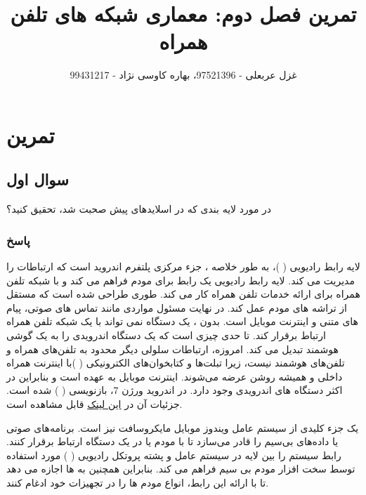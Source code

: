 \documentclass{report}
\title{تمرین فصل دوم: معماری شبکه های تلفن همراه
}
\author{غزل عربعلی - 97521396، بهاره کاوسی نژاد - 99431217}
\begin{document}
\maketitle
{}
\chapter*{تمرین 
}

\section*{سوال اول}
در مورد لایه بندی
  که در اسلایدهای پیش صحبت شد، تحقیق کنید؟

\subsection*{پاسخ}
لایه رابط رادیویی (
)، به طور خلاصه
 ، جزء مرکزی پلتفرم اندروید است که ارتباطات 
 را مدیریت می کند. لایه رابط رادیویی یک رابط برای مودم 
  فراهم می کند و با شبکه تلفن همراه برای ارائه خدمات تلفن همراه کار می کند.
    طوری طراحی شده است که مستقل از تراشه های مودم 
     عمل کند. در نهایت 
      مسئول مواردی مانند تماس های صوتی، پیام های متنی و اینترنت موبایل است. بدون 
      ، یک دستگاه
        نمی تواند با یک شبکه تلفن همراه ارتباط برقرار کند. 
         تا حدی چیزی است که یک دستگاه اندرویدی را به یک گوشی هوشمند تبدیل می کند. امروزه، ارتباطات سلولی دیگر محدود به تلفن‌های همراه و تلفن‌های هوشمند نیست، زیرا تبلت‌ها و کتابخوان‌های الکترونیکی (
         )با اینترنت همراه داخلی و همیشه روشن عرضه می‌شوند. اینترنت موبایل به عهده 
          است و بنابراین
            در اکثر دستگاه های اندرویدی وجود دارد.
            در اندروید ورژن 7،
            بازنویسی (
            )
            شده است. جزئیات آن در  
            \href{https://source.android.com/docs/core/connect/ril} {این لینک}
            قابل مشاهده است.
            
             یک جزء کلیدی از سیستم عامل ویندوز موبایل مایکروسافت نیز است.
               برنامه‌های صوتی یا داده‌های بی‌سیم را قادر می‌سازد تا با مودم
                 یا
                  در یک دستگاه
                    ارتباط برقرار کنند.
                     رابط سیستم را بین لایه
                       در سیستم عامل 
                        و پشته پروتکل رادیویی (
                        ) مورد استفاده توسط سخت افزار مودم بی سیم فراهم می کند. بنابراین 
                         همچنین به
                           ها اجازه می دهد تا با ارائه این رابط، انواع مودم ها را در تجهیزات خود ادغام کنند.
            
\end{document}

